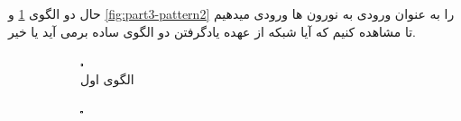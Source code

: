         حال دو الگوی 
        \ref{fig:part3-pattern1}
        و 
        \ref{fig:part3-pattern2} 
        را به عنوان ورودی به نورون ها ورودی میدهیم تا مشاهده کنیم که آیا شبکه از عهده یادگرفتن دو الگوی ساده برمی آید یا خیر.
        \begin{figure}[!ht]
            \centering
            \captionsetup{width=.9\linewidth}
            \begin{subfigure}[b]{0.35\textwidth}
                \centering
                \includegraphics[width=\textwidth]{images/pattern1.png}
                \caption{الگوی اول}
                \label{fig:part3-pattern1}
            \end{subfigure}
            \hfill
            \begin{subfigure}[b]{0.35\textwidth}
                \centering
                \includegraphics[width=\textwidth]{images/pattern2.png}

\end{subfigure}
\end{figure}
